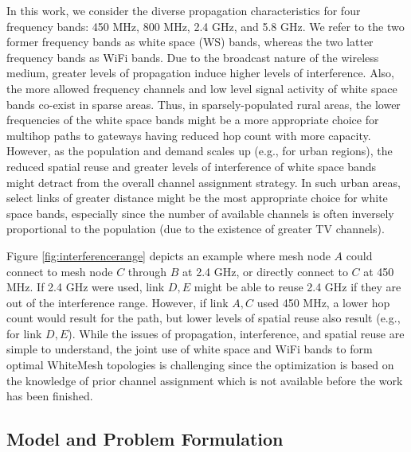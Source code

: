 In this work, we consider the diverse propagation characteristics
for four frequency bands: 450 MHz, 800 MHz, 2.4 GHz, and 5.8 GHz.
We refer to the two former frequency bands as white space (WS) bands, whereas
the two latter frequency bands as WiFi bands.
Due to the broadcast nature of the wireless medium, greater levels of
propagation induce higher levels of interference. Also, the more allowed frequency
channels and low level signal activity of white space bands co-exist in sparse areas. 
Thus, in sparsely-populated
rural areas, the lower frequencies of the white space bands might be a
more appropriate choice for multihop paths to gateways having reduced hop
count with more capacity. However, as the population and demand scales up (e.g., for 
urban regions), the reduced spatial reuse and greater levels of interference 
of white space bands might detract from the overall channel assignment strategy. 
In such urban areas, select links of greater distance might be the most 
appropriate choice for white space bands, especially since the number of 
available channels is often inversely proportional to the population (due 
to the existence of greater TV channels).

Figure \ref{fig:interferencerange} depicts an example where mesh node $A$ 
could connect to mesh node $C$ through $B$ at 2.4 GHz, or directly connect 
to $C$ at 450 MHz. If 2.4 GHz were used, link $D,E$ might be able to reuse
2.4 GHz if they are out of the interference range. However, if link $A,C$
used 450 MHz, a lower hop count would result for the path, but lower levels
of spatial reuse also result (e.g., for link $D,E$). While the issues of 
propagation, interference, and spatial reuse are simple to understand,
the joint use of white space and WiFi bands to form optimal WhiteMesh 
topologies is challenging since the optimization is based on the knowledge
of prior channel assignment which is not available before the work has been
finished.

\subsection{Model and Problem Formulation}
\label{subsec:problem}

